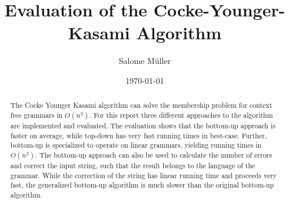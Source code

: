 \documentclass[10pt]{article}
\title{Evaluation of the Cocke-Younger-Kasami Algorithm}
\author{Salome Müller}
\date{\today}
\begin{document}
\maketitle

\begin{abstract}
    The Cocke Younger Kasami algorithm can solve the membership problem for context free grammars in $O(n^3)$.
    For this report three different approaches to the algorithm are implemented and evaluated.
    The evaluation shows that the bottom-up approach is faster on average, while top-down has very fast running times in best-case.
    Further, bottom-up is specialized to operate on linear grammars, yielding running times in $O(n^2)$.
    The bottom-up approach can also be used to calculate the number of errors and correct the input string, such that the result belongs to the language of the grammar.
    While the correction of the string has linear running time and proceeds very fast, the generalized bottom-up algorithm is much slower than the original bottom-up algorithm.
\end{abstract}

\pagebreak
\tableofcontents
\pagebreak







\pagebreak
\printbibliography
\end{document}
